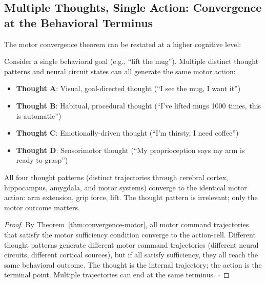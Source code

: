 \subsection{Multiple Thoughts, Single Action: Convergence at the Behavioral Terminus}
\label{subsec:multiple-thoughts}

The motor convergence theorem can be restated at a higher cognitive level:

\begin{theorem}
\label{thm:thought-convergence}
Consider a single behavioral goal (e.g., ``lift the mug''). Multiple distinct thought patterns and neural circuit states can all generate the same motor action:

\begin{itemize}[noitemsep]
\item \textbf{Thought A}: Visual, goal-directed thought (``I see the mug, I want it'')
\item \textbf{Thought B}: Habitual, procedural thought (``I've lifted mugs 1000 times, this is automatic'')
\item \textbf{Thought C}: Emotionally-driven thought (``I'm thirsty, I need coffee'')
\item \textbf{Thought D}: Sensorimotor thought (``My proprioception says my arm is ready to grasp'')
\end{itemize}

All four thought patterns (distinct trajectories through cerebral cortex, hippocampus, amygdala, and motor systems) converge to the identical motor action: arm extension, grip force, lift. The thought pattern is irrelevant; only the motor outcome matters.
\end{theorem}

\begin{proof}
By Theorem~\ref{thm:convergence-motor}, all motor command trajectories that satisfy the motor sufficiency condition converge to the action-cell. Different thought patterns generate different motor command trajectories (different neural circuits, different cortical sources), but if all satisfy sufficiency, they all reach the same behavioral outcome. The thought is the internal trajectory; the action is the terminal point. Multiple trajectories can end at the same terminus. $\square$
\end{proof}

